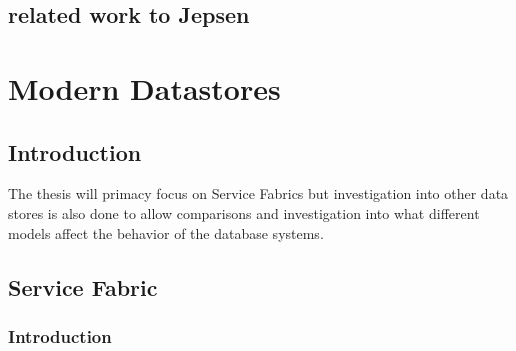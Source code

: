 \documentclass[a4paper,10pt,titlepage]{report}
\begin{document}
    \section{related work to Jepsen}
    








    \newpage


    \chapter{Modern Datastores}


    \section{Introduction}

    The thesis will primacy focus on Service Fabrics but investigation into other data stores is also done to allow comparisons and investigation into what different models affect the behavior of the database systems.


    \section{Service Fabric}

%

    \subsection{Introduction}
\end{document}
